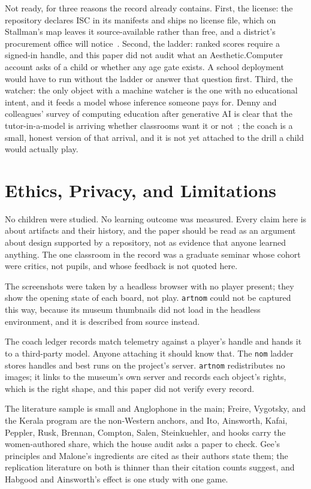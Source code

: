 \documentclass[10pt,letterpaper,twocolumn]{article}
\newcommand{\acdot}{{\color{acpink}.}}
\newcommand{\ac}{Aesthetic{\acdot}Computer}
\newcommand{\code}[1]{\texttt{#1}}
\begin{document}
Not ready, for three reasons the record already contains. First, the license: the repository declares ISC in its manifests and ships no license file, which on Stallman's map leaves it source-available rather than free, and a district's procurement office will notice~\citep{scudder2026freevsopen}. Second, the ladder: ranked scores require a signed-in handle, and this paper did not audit what an \ac{} account asks of a child or whether any age gate exists. A school deployment would have to run without the ladder or answer that question first. Third, the watcher: the only object with a machine watcher is the one with no educational intent, and it feeds a model whose inference someone pays for. Denny and colleagues' survey of computing education after generative AI is clear that the tutor-in-a-model is arriving whether classrooms want it or not~\citep{denny2024computing}; the coach is a small, honest version of that arrival, and it is not yet attached to the drill a child would actually play.

\section{Ethics, Privacy, and Limitations}
\label{sec:limits}

No children were studied. No learning outcome was measured. Every claim here is about artifacts and their history, and the paper should be read as an argument about design supported by a repository, not as evidence that anyone learned anything. The one classroom in the record was a graduate seminar whose cohort were critics, not pupils, and whose feedback is not quoted here.

The screenshots were taken by a headless browser with no player present; they show the opening state of each board, not play. \code{artnom} could not be captured this way, because its museum thumbnails did not load in the headless environment, and it is described from source instead.

The coach ledger records match telemetry against a player's handle and hands it to a third-party model. Anyone attaching it should know that. The \code{nom} ladder stores handles and best runs on the project's server. \code{artnom} redistributes no images; it links to the museum's own server and records each object's rights, which is the right shape, and this paper did not verify every record.

The literature sample is small and Anglophone in the main; Freire, Vygotsky, and the Kerala program are the non-Western anchors, and Ito, Ainsworth, Kafai, Peppler, Rusk, Brennan, Compton, Salen, Steinkuehler, and hooks carry the women-authored share, which the house audit asks a paper to check. Gee's principles and Malone's ingredients are cited as their authors state them; the replication literature on both is thinner than their citation counts suggest, and Habgood and Ainsworth's effect is one study with one game.
\end{document}
